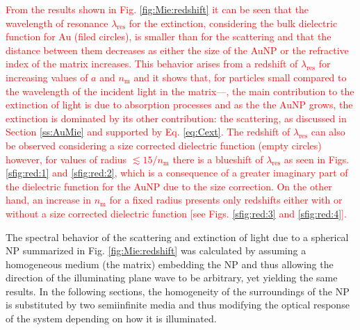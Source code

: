 \textcolor{red}{
From the results shown in Fig. \ref{fig:Mie:redshift} it can be seen that the wavelength of resonance  $\lambda_\text{res}$ for the extinction, considering the bulk dielectric function for Au (filed circles), is smaller than for the scattering  and that the distance between them decreases as either the size of the AuNP or the refractive index of the matrix increases. This behavior arises from a redshift of $\lambda_\text{res}$ for increasing values of $a$ and $n_\text{m}$ and it shows that, for particles small compared to the wavelength of the incident light in the matrix---, the main contribution to the extinction of light  is due to absorption processes and as the the AuNP grows, the extinction is dominated by its other contribution: the scattering, as discussed in Section \ref{ss:AuMie} and supported by Eq. \eqref{eq:Cext}. The redshift of   $\lambda_\text{res}$ can also be observed considering a size corrected dielectric function (empty circles) however, for values of radius $\lesssim 15/n_\text{m}$ there is a blueshift of $\lambda_\text{res}$ as seen in Figs. \ref{sfig:red:1} and \ref{sfig:red:2}, which is a consequence of a greater imaginary part of the dielectric function for the AuNP due to the size correction. On the other hand, an increase in $n_\text{m}$ for a fixed radius presents only redshifts either with or without a size corrected dielectric function [see Figs. \ref{sfig:red:3} and  \ref{sfig:red:4}].
}

The spectral behavior of the scattering and extinction of light due to a spherical NP summarized in Fig. \ref{fig:Mie:redshift} was calculated by assuming a homogeneous medium (the matrix) embedding the NP and thus allowing the direction of the illuminating plane wave to be arbitrary, yet yielding the same results. In the following sections, the homogeneity of the surroundings of the NP is substituted by two semiinfinite media and thus modifying the optical response of the system depending on how it is illuminated.
